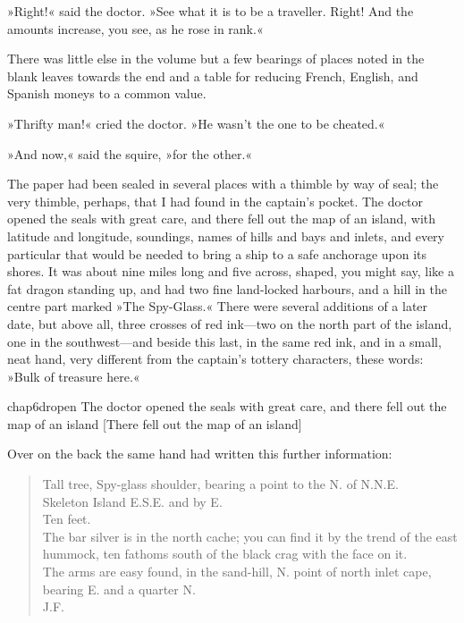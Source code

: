 »Right!« said the doctor. »See what it is to be a traveller. Right! And the amounts increase, you see, as he rose in rank.«

There was little else in the volume but a few bearings of places noted in the blank leaves towards the end and a table for reducing French, English, and Spanish moneys to a common value.

»Thrifty man!« cried the doctor. »He wasn't the one to be cheated.«

»And now,« said the squire, »for the other.«

 
The paper had been sealed in several places with a thimble by way of seal; the very thimble, perhaps, that I had found in the captain's pocket. The doctor opened the seals with great care, and there fell out the map of an island, with latitude and longitude, soundings, names of hills and bays and inlets, and every particular that would be needed to bring a ship to a safe anchorage upon its shores. It was about nine miles long and five across, shaped, you might say, like a fat dragon standing up, and had two fine land-locked harbours, and a hill in the centre part marked »The Spy-Glass.« There were several additions of a later date, but above all, three crosses of red ink—two on the north part of the island, one in the southwest—and beside this last, in the same red ink, and in a small, neat hand, very different from the captain's tottery characters, these words: »Bulk of treasure here.«



\begin{bwbigpic}
	[\picsize]
	{chap6dropen}
	{The doctor opened the seals with great care, and there fell out the map of an island}
	[There fell out the map of an island]
\end{bwbigpic}

Over on the back the same hand had written this further information:

\blockquote{
Tall tree, Spy-glass shoulder, bearing a point to the N. of N.N.E.\\
Skeleton Island E.S.E. and by E.\\
Ten feet.\\
The bar silver is in the north cache; you can find it by the trend of the east hummock, ten fathoms south of the black crag with the face on it.\\
The arms are easy found, in the sand-hill, N. point of north inlet cape, bearing E. and a quarter N.\\
\textsc{J.F.}}

